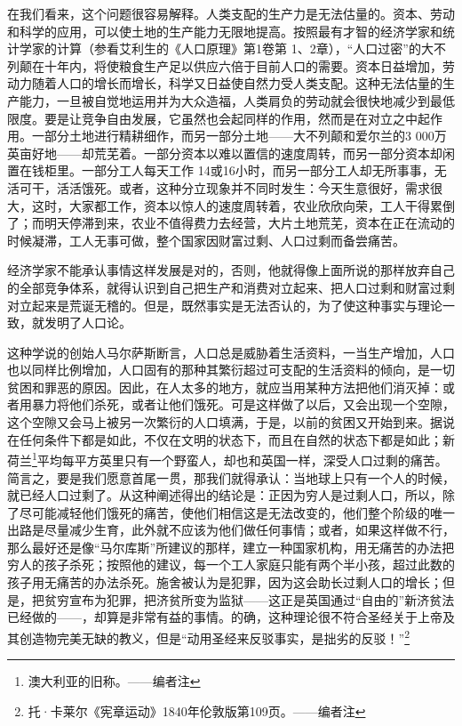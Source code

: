 \documentclass[a4paper,twoside,12pt]{ctexart}
\begin{document}
在我们看来，这个问题很容易解释。人类支配的生产力是无法估量的。资本、劳动和科学的应用，可以使土地的生产能力无限地提高。按照最有才智的经济学家和统计学家的计算（参看艾利生的《人口原理》第1卷第 1、2章），“人口过密”的大不列颠在十年内，将使粮食生产足以供应六倍于目前人口的需要。资本日益增加，劳动力随着人口的增长而增长，科学又日益使自然力受人类支配。这种无法估量的生产能力，一旦被自觉地运用并为大众造福，人类肩负的劳动就会很快地减少到最低限度。要是让竞争自由发展，它虽然也会起同样的作用，然而是在对立之中起作用。一部分土地进行精耕细作，而另一部分土地——大不列颠和爱尔兰的3 000万英亩好地——却荒芜着。一部分资本以难以置信的速度周转，而另一部分资本却闲置在钱柜里。一部分工人每天工作 14或16小时，而另一部分工人却无所事事，无活可干，活活饿死。或者，这种分立现象并不同时发生：今天生意很好，需求很大，这时，大家都工作，资本以惊人的速度周转着，农业欣欣向荣，工人干得累倒了；而明天停滞到来，农业不值得费力去经营，大片土地荒芜，资本在正在流动的时候凝滞，工人无事可做，整个国家因财富过剩、人口过剩而备尝痛苦。

经济学家不能承认事情这样发展是对的，否则，他就得像上面所说的那样放弃自己的全部竞争体系，就得认识到自己把生产和消费对立起来、把人口过剩和财富过剩对立起来是荒诞无稽的。但是，既然事实是无法否认的，为了使这种事实与理论一致，就发明了人口论。

这种学说的创始人马尔萨斯断言，人口总是威胁着生活资料，一当生产增加，人口也以同样比例增加，人口固有的那种其繁衍超过可支配的生活资料的倾向，是一切贫困和罪恶的原因。因此，在人太多的地方，就应当用某种方法把他们消灭掉：或者用暴力将他们杀死，或者让他们饿死。可是这样做了以后，又会出现一个空隙，这个空隙又会马上被另一次繁衍的人口填满，于是，以前的贫困又开始到来。据说在任何条件下都是如此，不仅在文明的状态下，而且在自然的状态下都是如此；新荷兰\footnote{澳大利亚的旧称。——编者注}平均每平方英里只有一个野蛮人，却也和英国一样，深受人口过剩的痛苦。简言之，要是我们愿意首尾一贯，那我们就得承认：当地球上只有一个人的时候，就已经人口过剩了。从这种阐述得出的结论是：正因为穷人是过剩人口，所以，除了尽可能减轻他们饿死的痛苦，使他们相信这是无法改变的，他们整个阶级的唯一出路是尽量减少生育，此外就不应该为他们做任何事情；或者，如果这样做不行，那么最好还是像“马尔库斯”所建议的那样，建立一种国家机构，用无痛苦的办法把穷人的孩子杀死；按照他的建议，每一个工人家庭只能有两个半小孩，超过此数的孩子用无痛苦的办法杀死。施舍被认为是犯罪，因为这会助长过剩人口的增长；但是，把贫穷宣布为犯罪，把济贫所变为监狱——这正是英国通过“自由的”新济贫法已经做的——，却算是非常有益的事情。的确，这种理论很不符合圣经关于上帝及其创造物完美无缺的教义，但是“动用圣经来反驳事实，是拙劣的反驳！”\footnote{托·卡莱尔《宪章运动》1840年伦敦版第109页。——编者注}
\end{document}

